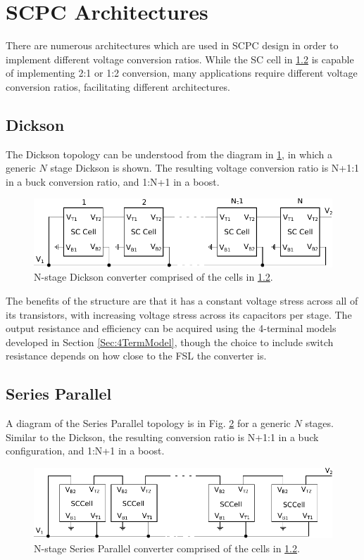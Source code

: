 	
	
	
	\section{SCPC Architectures}
	There are numerous architectures which are used in SCPC design in order to implement different voltage conversion ratios. While the SC cell in \ref{} is capable of implementing 2:1 or 1:2 conversion, many applications require different voltage conversion ratios, facilitating different architectures.
	\subsection{Dickson}
	The Dickson topology can be understood from the diagram in \ref{fig:NDickson}, in which a generic $N$ stage Dickson is shown. The resulting voltage conversion ratio is N+1:1 in a buck conversion ratio, and 1:N+1 in a boost.
	
	\begin{figure}
		\includegraphics[width=\linewidth]{4Terminal/Figures/NDickson.pdf}
		\caption{N-stage Dickson converter comprised of the cells in \ref{}.}
		\label{fig:NDickson}
	\end{figure}
	
	The benefits of the structure are that it has a constant voltage stress across all of its transistors, with increasing voltage stress across its capacitors per stage. The output resistance and efficiency can be acquired using the 4-terminal models developed in Section \ref{Sec:4TermModel}, though the choice to include switch resistance depends on how close to the FSL the converter is.
	\subsection{Series Parallel}
	A diagram of the Series Parallel topology is in Fig. \ref{fig:NSeriesP} for a generic $N$ stages. Similar to the Dickson, the resulting conversion ratio is N+1:1 in a buck configuration, and 1:N+1 in a boost.
	
	\begin{figure}
		\includegraphics[width=\linewidth]{4Terminal/Figures/NSeriesP.pdf}
		\caption[width=\linewidth]{N-stage Series Parallel converter comprised of the cells in \ref{}.}
		\label{fig:NSeriesP}
	\end{figure}
	
